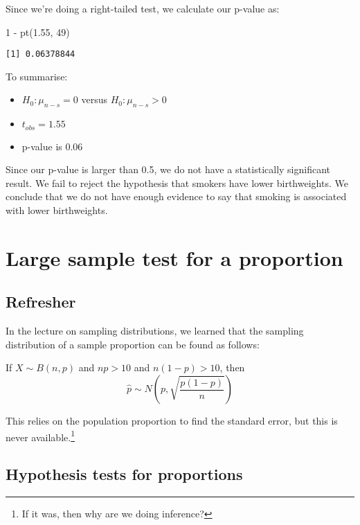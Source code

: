 \documentclass[
  letterpaper,
  DIV=11,
  numbers=noendperiod]{scrreprt}
\newenvironment{Shaded}{\begin{snugshade}}{\end{snugshade}}
\newcommand{\DecValTok}[1]{\textcolor[rgb]{0.68,0.00,0.00}{#1}}
\newcommand{\FloatTok}[1]{\textcolor[rgb]{0.68,0.00,0.00}{#1}}
\newcommand{\FunctionTok}[1]{\textcolor[rgb]{0.28,0.35,0.67}{#1}}
\newcommand{\NormalTok}[1]{\textcolor[rgb]{0.00,0.23,0.31}{#1}}
\newcommand{\SpecialCharTok}[1]{\textcolor[rgb]{0.37,0.37,0.37}{#1}}
\providecommand{\tightlist}{%
  \setlength{\itemsep}{0pt}\setlength{\parskip}{0pt}}\usepackage{longtable,booktabs,array}
\begin{document}
Since we're doing a right-tailed test, we calculate our p-value as:

\begin{Shaded}
\begin{Highlighting}[]
\DecValTok{1} \SpecialCharTok{{-}} \FunctionTok{pt}\NormalTok{(}\FloatTok{1.55}\NormalTok{, }\DecValTok{49}\NormalTok{)}
\end{Highlighting}
\end{Shaded}

\begin{verbatim}
[1] 0.06378844
\end{verbatim}

To summarise:

\begin{itemize}
\tightlist
\item
  \(H_0: \mu_{n - s} = 0\) versus \(H_0: \mu_{n - s} > 0\)
\item
  \(t_{obs} = 1.55\)
\item
  p-value is 0.06
\end{itemize}

Since our p-value is larger than 0.5, we do not have a statistically
significant result. We fail to reject the hypothesis that smokers have
lower birthweights. We conclude that we do not have enough evidence to
say that smoking is associated with lower birthweights.

\hypertarget{large-sample-test-for-a-proportion}{%
\chapter{Large sample test for a
proportion}\label{large-sample-test-for-a-proportion}}

\hypertarget{refresher}{%
\section{Refresher}\label{refresher}}

In the lecture on sampling distributions, we learned that the sampling
distribution of a sample proportion can be found as follows:

If \(X\sim B(n,p)\) and \(np>10\) and \(n(1-p)>10\), then \[
\hat p \sim N\left(p, \sqrt{\frac{p(1-p)}{n}}\right)
\]

This relies on the population proportion to find the standard error, but
this is never available.\footnote{If it was, then why are we doing
  inference?}

\hypertarget{hypothesis-tests-for-proportions}{%
\section{Hypothesis tests for
proportions}\label{hypothesis-tests-for-proportions}}
\end{document}
